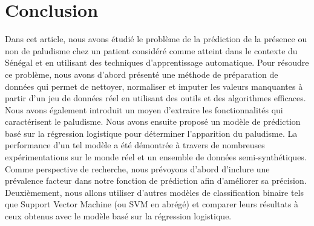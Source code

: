 \section{Conclusion}\label{conclusion}
Dans cet article, nous avons étudié le problème de la prédiction de la présence ou non de paludisme chez un patient considéré comme atteint dans le contexte du Sénégal et en utilisant des techniques d’apprentissage automatique.
Pour résoudre ce problème, nous avons d’abord présenté une méthode de préparation de données qui permet de nettoyer, normaliser et imputer les valeurs manquantes à partir d'un jeu de données réel en utilisant des outils et des algorithmes efficaces. Nous avons également introduit un moyen d’extraire les fonctionnalités qui caractérisent le paludisme. Nous avons ensuite proposé un modèle de prédiction basé sur la régression logistique pour déterminer l'apparition du paludisme. La performance d’un tel modèle a été démontrée à travers de nombreuses expérimentations sur le monde réel et un ensemble de données semi-synthétiques. Comme perspective de recherche, nous prévoyons d’abord d’inclure une prévalence facteur dans notre fonction de prédiction afin d’améliorer sa précision. Deuxièmement, nous allons utiliser d'autres modèles de classification binaire tels que Support Vector Machine (ou SVM en abrégé) et comparer leurs résultats à ceux obtenus avec le modèle basé sur la régression logistique.
